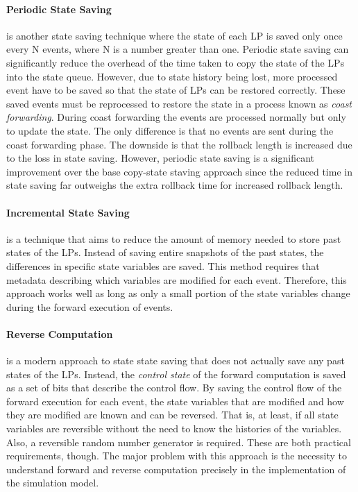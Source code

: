 \documentclass[11pt]{book}
\begin{document}
\paragraph{Periodic State Saving} is another state saving technique where the state of each LP
is saved only once every N events, where N is a number greater than one. Periodic state
saving can significantly reduce the overhead of the time taken to copy the state of the
LPs into the state queue. However, due to state history being lost, more processed event
have to be saved so that the state of LPs can be restored correctly. These saved events
must be reprocessed to restore the state in a process known as \emph{coast forwarding}.
During coast forwarding the events are processed normally but only to update the state.
The only difference is that no events are sent during the coast forwarding phase. The
downside is that the rollback length is increased due to the loss in state saving. However,
periodic state saving is a significant improvement over the base copy-state staving approach
since the reduced time in state saving far outweighs the extra rollback time for increased
rollback length.

\paragraph{Incremental State Saving} is a technique that aims to reduce the amount of
memory needed to store past states of the LPs. Instead of saving entire snapshots of the
past states, the differences in specific state variables are saved. This method requires
that metadata describing which variables are modified for each event. Therefore, this approach
works well as long as only a small portion of the state variables change during the forward
execution of events.

\paragraph{Reverse Computation} is a modern approach to state state saving that does not
actually save any past states of the LPs. Instead, the \emph{control state} of the forward
computation is saved as a set of bits that describe the control flow. By saving the control
flow of the forward execution for each event, the state variables that are modified and
how they are modified are known and can be reversed. That is, at least, if all state variables
are reversible without the need to know the histories of the variables. Also, a reversible
random number generator is required. These are both practical requirements, though. The major
problem with this approach is the necessity to understand forward and reverse computation
precisely in the implementation of the simulation model.
\end{document}

